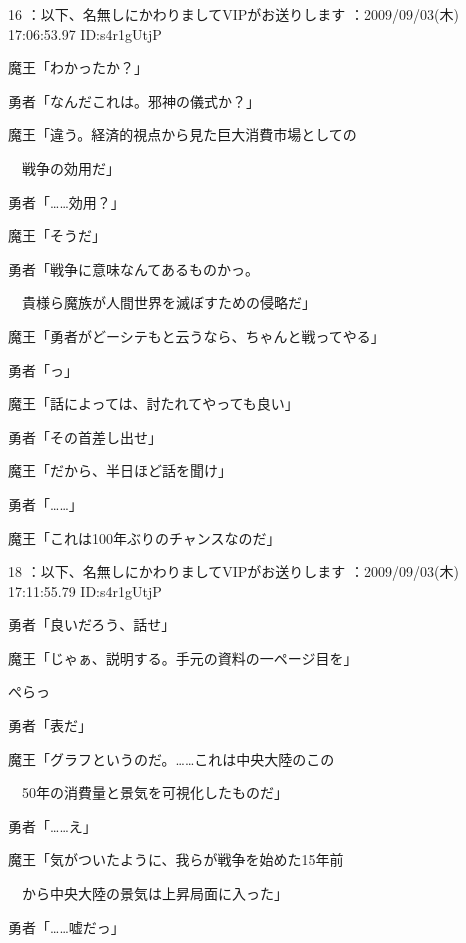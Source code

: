 \documentclass[a4j,twocolumn]{tarticle}
\begin{document}
	 
    
	

16 ：以下、名無しにかわりましてVIPがお送りします ：2009/09/03(木) 17:06:53.97 ID:s4r1gUtjP 


魔王「わかったか？」\par{} 
勇者「なんだこれは。邪神の儀式か？」 



魔王「違う。経済的視点から見た巨大消費市場としての\par{} 
　戦争の効用だ」 



勇者「……効用？」\par{} 
魔王「そうだ」 



勇者「戦争に意味なんてあるものかっ。\par{} 
　貴様ら魔族が人間世界を滅ぼすための侵略だ」 



魔王「勇者がどーシテもと云うなら、ちゃんと戦ってやる」\par{} 
勇者「っ」\par{} 
魔王「話によっては、討たれてやっても良い」\par{} 
勇者「その首差し出せ」\par{} 
魔王「だから、半日ほど話を聞け」\par{} 
勇者「……」 



魔王「これは100年ぶりのチャンスなのだ」

	
     
	

18 ：以下、名無しにかわりましてVIPがお送りします ：2009/09/03(木) 17:11:55.79 ID:s4r1gUtjP 


勇者「良いだろう、話せ」\par{} 
魔王「じゃぁ、説明する。手元の資料の一ページ目を」 



ぺらっ 



勇者「表だ」\par{} 
魔王「グラフというのだ。……これは中央大陸のこの\par{} 
　50年の消費量と景気を可視化したものだ」\par{} 
勇者「……え」 



魔王「気がついたように、我らが戦争を始めた15年前\par{} 
　から中央大陸の景気は上昇局面に入った」\par{} 
勇者「……嘘だっ」 
\end{document}
